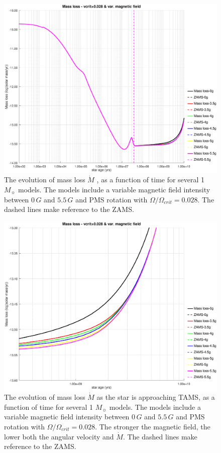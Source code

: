 \documentclass[fleqn,usenatbib]{mnras}
\begin{document}
\begin{figure}
	\includegraphics[trim = 30mm 15mm 20mm 15mm, clip,width=\columnwidth]{figures/mdot_vc_028_var_g.eps}
    \caption{The evolution of mass loss $\Dot{M}$ , as a function of time for several 1 $M_{\sun}$ models. The models include a variable magnetic field intensity between $0\,G$ and $5.5\,G$ and PMS rotation with $\Omega / \Omega_{crit}=0.028$. The dashed lines make reference to the ZAMS.}
    \label{fig:mdot_vc_028_var_b}
\end{figure}

\begin{figure}
	\includegraphics[trim = 30mm 15mm 20mm 15mm, clip,width=\columnwidth]{figures/mdot_vc_028_var_g_z1.eps}
    \caption{The evolution of mass loss $\Dot{M}$ as the star is approaching TAMS, as a function of time for several 1 $M_{\sun}$ models. The models include a variable magnetic field intensity between $0\,G$ and $5.5\,G$ and PMS rotation with $\Omega / \Omega_{crit}=0.028$. The stronger the magnetic field, the lower both the angular velocity and $\Dot{M}$. The dashed lines make reference to the ZAMS.}
    \label{fig:mdot_vc_028_var_b_z1}
\end{figure}
\end{document}
